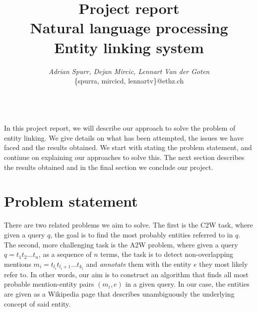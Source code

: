 \documentclass{article}
\begin{document}

\toappear{}



\title{Project report\\
	   \small{Natural language processing\\Entity linking system}
}


\author{
\parbox[t]{9cm}{\centering
	     {\em Adrian Spurr, Dejan Mircic, Lennart Van der Goten}\\            
	     \{spurra, mircicd, lennartv\}@ethz.ch}\\
}

\maketitle

\abstract
In this project report, we will describe our approach to solve the problem of entity linking. We give details on what has been attempted, the issues we have faced and the results obtained. We start with stating the problem statement, and continue on explaining our approaches to solve this. The next section describes the results obtained and in the final section we conclude our project.


\section{Problem statement}
There are two related problems we aim to solve. The first is the C2W task, where given a query $q$, the goal is to find the most probably entities referred to in $q$. The second, more challenging task is the A2W problem, where given a query $q = t_1t_2 \dots t_n$, as a sequence of $n$ terms, the task is to detect non-overlapping mentions $m_i = t_{l_i}t_{l_i+1}\dots t_{k_i}$ and \textit{annotate} them with the entity $e$ they most likely refer to. In other words, our aim is to construct an algorithm that finds all most probable mention-entity pairs $(m_i, e)$ in a given query. In our case, the entities are given as a Wikipedia page that describes unambiguously the underlying concept of said entity.\\
\end{document}
